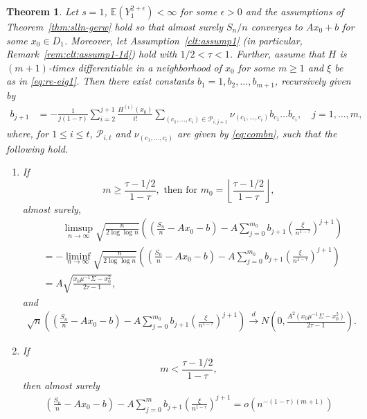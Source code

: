 \documentclass[12pt]{amsart}
\theoremstyle{plain}
\newtheorem{theorem}{Theorem}[section]
\theoremstyle{remark}
\numberwithin{equation}{section}
\begin{document}
\begin{theorem}\label{thm:super-dev1m}
Let $s = 1$, $\mathbb{E}\left({Y}_1^{2+\epsilon}\right) < \infty$ for some $\epsilon > 0$ and the assumptions of Theorem~\ref{thm:slln-gerw} hold so that almost surely ${{S}_n}/{n}$ converges to ${A}{x}_0 + {b}$ for some ${x}_0 \in {D}_1$. Moreover, let Assumption~\ref{clt:assump1} (in particular, Remark~\ref{rem:clt:assump1-1d}) hold with $1/2 < \tau < 1$. Further, assume that ${H}$ is $(m+1)$-times differentiable in a neighborhood of $x_0$ 
for some $m \geq 1$ and ${\xi}$ be as in \eqref{eq:re-eig1}.
Then there exist constants $b_1 = 1, b_2, \ldots, b_{m+1}$, recursively given by
\begin{align*}b_{j+1} &= -\frac{1}{j(1-\tau)}\sum_{i=2}^{j+1}\frac{H^{(i)}(x_0)}{i!}\sum_{(c_1, \ldots, c_i) \in \mathcal{P}_{i,j+1}}\nu_{(c_1, \ldots, c_i)}b_{c_1}\ldots b_{c_i}, \quad j = 1, \ldots, m,\nonumber\end{align*} 
where, for $1 \leq i \leq t$, $\mathcal{P}_{i,t}$ and $\nu_{(c_1, \ldots, c_i)}$ are given by \eqref{eq:combn}, 
such that the following hold.
\begin{enumerate}
\item[a)] If \[ m \geq \frac{\tau - 1/2}{1-\tau}, \text{ then for } m_0 = \left\lfloor\frac{\tau - 1/2}{1-\tau}\right\rfloor,\]
almost surely,
\begin{align} \label{eq:slil-gerw}
    &\quad\quad\limsup_{n\to\infty}\sqrt{\frac{n}{2\log \log n}}\left(\left(\frac{{S}_n}{n} - {A}{x}_0 - {b}\right) - {A}\sum_{j = 0}^{m_0} b_{j+1}\left(\frac{\xi}{n^{1-\tau}}\right)^{j+1}
    \right) \nonumber\\
    &=-\liminf_{n\to\infty}\sqrt{\frac{n}{2\log \log n}}\left(\left(\frac{{S}_n}{n} - {A}{x}_0 - {b}\right) - {A}\sum_{j = 0}^{m_0} b_{j+1}\left(\frac{\xi}{n^{1-\tau}}\right)^{j+1} \right) \nonumber\\
   &= A\sqrt{\frac{{{x_0\mu^{-1}{\Sigma}-x^2_0}}}{2\tau -1}},
\end{align}
and 
\begin{align} \label{eq:sclt-gerw}
    \sqrt{n}\left(\left(\frac{{S}_n}{n} - {A}{x}_0 - {b}\right) - {A}\sum_{j = 0}^{m_0} b_{j+1}\left(\frac{\xi}{n^{1-\tau}}\right)^{j+1}\right) \stackrel{d}{\to} {N}\left(0, \frac{{A^2}\left({{x_0\mu^{-1}{\Sigma}-x^2_0}}\right)}{2\tau -1}\right).
\end{align}
\item[b)] If \[ m < \frac{\tau - 1/2}{1-\tau},\] 
then almost surely
\begin{align} \label{eq:s-gerw}
   \left(\frac{{S}_n}{n} - {A}{x}_0 - {b}\right) - {A}\sum_{j = 0}^{m} b_{j+1}\left(\frac{\xi}{n^{1-\tau}}\right)^{j+1} 
    = o\left({n}^{-(1-\tau){(m+1)}}\right)
\end{align}
\end{enumerate}
\end{theorem}
\end{document}
